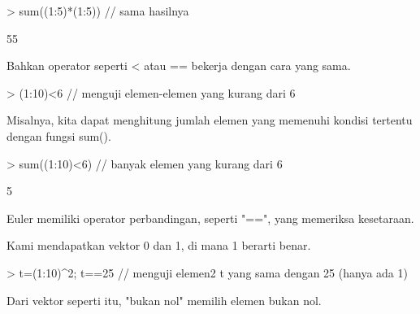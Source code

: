 \documentclass[a4paper,10pt]{article}
\begin{document}
\begin{eulernotebook}
\begin{eulercomment}
\begin{eulercomment}
\begin{eulercomment}
\begin{eulercomment}
\begin{eulercomment}
\begin{eulercomment}
\begin{eulerprompt}
> sum((1:5)*(1:5)) // sama hasilnya
\end{eulerprompt}
\begin{euleroutput}
  55
\end{euleroutput}
\begin{eulercomment}
Bahkan operator seperti \textless{} atau == bekerja dengan cara yang sama.
\end{eulercomment}
\begin{eulerprompt}
> (1:10)<6 // menguji elemen-elemen yang kurang dari 6
\end{eulerprompt}
\begin{euleroutput}
  [1,  1,  1,  1,  1,  0,  0,  0,  0,  0]
\end{euleroutput}
\begin{eulercomment}
Misalnya, kita dapat menghitung jumlah elemen yang memenuhi kondisi
tertentu dengan fungsi sum().
\end{eulercomment}
\begin{eulerprompt}
> sum((1:10)<6) // banyak elemen yang kurang dari 6
\end{eulerprompt}
\begin{euleroutput}
  5
\end{euleroutput}
\begin{eulercomment}
Euler memiliki operator perbandingan, seperti "==", yang memeriksa
kesetaraan.

Kami mendapatkan vektor 0 dan 1, di mana 1 berarti benar.
\end{eulercomment}
\begin{eulerprompt}
> t=(1:10)^2; t==25 // menguji elemen2 t yang sama dengan 25 (hanya ada 1)
\end{eulerprompt}
\begin{euleroutput}
  [0,  0,  0,  0,  1,  0,  0,  0,  0,  0]
\end{euleroutput}
\begin{eulercomment}
Dari vektor seperti itu, "bukan nol" memilih elemen bukan nol.


\end{eulercomment}
\end{eulercomment}
\end{eulercomment}
\end{eulercomment}
\end{eulercomment}
\end{eulercomment}
\end{eulercomment}
\end{eulernotebook}
\end{document}
